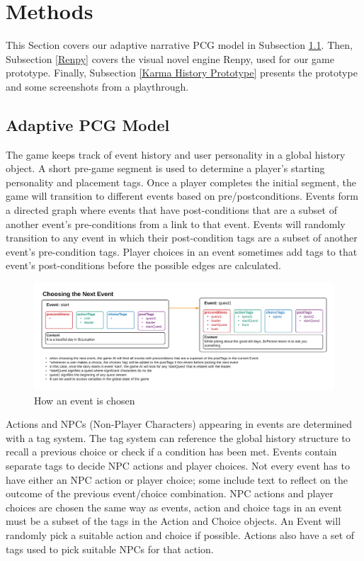 \section{Methods} \label{Methods}
This Section covers our adaptive narrative PCG model in Subsection \ref{Adaptive PCG Model}. Then, Subsection \ref{Renpy} covers the visual novel engine Renpy, used for our game prototype. Finally, Subsection \ref{Karma History Prototype} presents the prototype and some screenshots from a playthrough.

\subsection{Adaptive PCG Model} \label{Adaptive PCG Model}
The game keeps track of event history and user personality in a global history object. A short pre-game segment is used to determine a player's starting personality and placement tags. Once a player completes the initial segment, the game will transition to different events based on pre/postconditions. Events form a directed graph where events that have post-conditions that are a subset of another event's pre-conditions from a link to that event. Events will randomly transition to any event in which their post-condition tags are a subset of another event's pre-condition tags. Player choices in an event sometimes add tags to that event's post-conditions before the possible edges are calculated.

\begin{figure}[ht]
    \centering
    \includegraphics[width=\textwidth]{images/eventChoice.png}
    \caption{How an event is chosen}
    \label{fig:eventChoose}
\end{figure}

Actions and NPCs (Non-Player Characters) appearing in events are determined with a tag system. The tag system can reference the global history structure to recall a previous choice or check if a condition has been met. Events contain separate tags to decide NPC actions and player choices. Not every event has to have either an NPC action or player choice; some include text to reflect on the outcome of the previous event/choice combination. NPC actions and player choices are chosen the same way as events, action and choice tags in an event must be a subset of the tags in the Action and Choice objects. An Event will randomly pick a suitable action and choice if possible. Actions also have a set of tags used to pick suitable NPCs for that action. 

